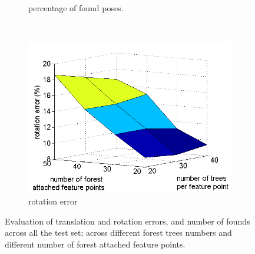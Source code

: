 \documentclass[annual]{acmsiggraph}
\begin{document}
\begin{figure}[h]
\begin{subfigure}[c]{0.48\columnwidth}
	\caption{percentage of found poses.}
	\label{img:eval:tau_rfff:foundRate}
\end{subfigure}\\%
\begin{subfigure}[c]{0.55\columnwidth} 
	\includegraphics[width=\textwidth]{images/eval_tau_fts_quat.png} 
	\caption{rotation error}
	\label{img:eval:tau_rfff:quat}
\end{subfigure}%

\caption{Evaluation of translation and rotation errors, and number of founds across all the test set; across different forest trees numbers and different number of forest attached feature points.}
\label{img:eval:tau_rfff}
\end{figure}
\end{document}
